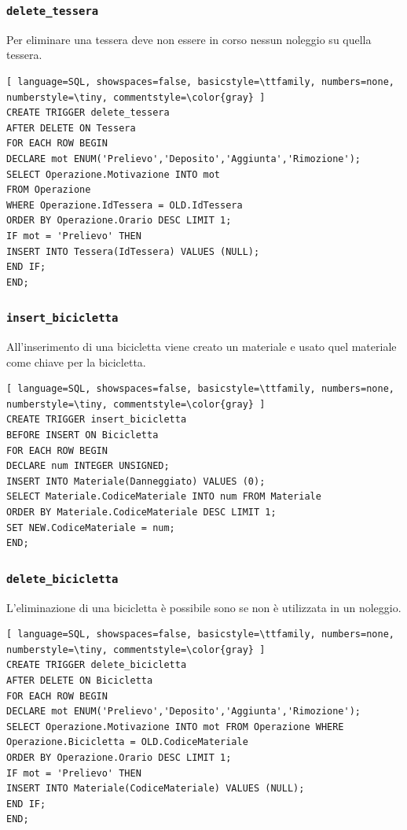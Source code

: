 \documentclass[a4paper,twoside]{article}
\begin{document}
\subsubsection{\texttt{delete\_tessera}}
Per eliminare una tessera deve non essere in corso nessun noleggio su quella tessera.
\begin{lstlisting}[ language=SQL, showspaces=false, basicstyle=\ttfamily, numbers=none, numberstyle=\tiny, commentstyle=\color{gray} ]
CREATE TRIGGER delete_tessera
AFTER DELETE ON Tessera
FOR EACH ROW BEGIN
DECLARE mot ENUM('Prelievo','Deposito','Aggiunta','Rimozione');
SELECT Operazione.Motivazione INTO mot
FROM Operazione
WHERE Operazione.IdTessera = OLD.IdTessera
ORDER BY Operazione.Orario DESC LIMIT 1;
IF mot = 'Prelievo' THEN
INSERT INTO Tessera(IdTessera) VALUES (NULL);
END IF;
END;
\end{lstlisting}
\subsubsection{\texttt{insert\_bicicletta}}
All'inserimento di una bicicletta viene creato un materiale e usato quel materiale come chiave per la bicicletta.
\begin{lstlisting}[ language=SQL, showspaces=false, basicstyle=\ttfamily, numbers=none, numberstyle=\tiny, commentstyle=\color{gray} ]
CREATE TRIGGER insert_bicicletta
BEFORE INSERT ON Bicicletta
FOR EACH ROW BEGIN
DECLARE num INTEGER UNSIGNED;
INSERT INTO Materiale(Danneggiato) VALUES (0);
SELECT Materiale.CodiceMateriale INTO num FROM Materiale
ORDER BY Materiale.CodiceMateriale DESC LIMIT 1;
SET NEW.CodiceMateriale = num;
END;
\end{lstlisting}
\subsubsection{\texttt{delete\_bicicletta}}
L'eliminazione di una bicicletta è possibile sono se non è utilizzata in un noleggio.
\begin{lstlisting}[ language=SQL, showspaces=false, basicstyle=\ttfamily, numbers=none, numberstyle=\tiny, commentstyle=\color{gray} ]
CREATE TRIGGER delete_bicicletta
AFTER DELETE ON Bicicletta
FOR EACH ROW BEGIN
DECLARE mot ENUM('Prelievo','Deposito','Aggiunta','Rimozione');
SELECT Operazione.Motivazione INTO mot FROM Operazione WHERE
Operazione.Bicicletta = OLD.CodiceMateriale
ORDER BY Operazione.Orario DESC LIMIT 1;
IF mot = 'Prelievo' THEN
INSERT INTO Materiale(CodiceMateriale) VALUES (NULL);
END IF;
END;
\end{lstlisting}
\end{document}
